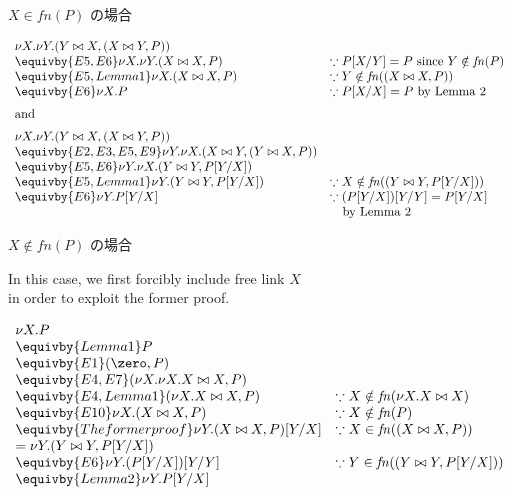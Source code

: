 \begin{frame}{
    \(X \in \mathit{fn}(P)\) の場合
  }
  
  
  \(\begin{array}{ll}
  \nu X. \nu Y. (Y \bowtie X, (X \bowtie Y, P)) &
  \\
  \equivby{E5, E6}
  \nu X. \nu Y. (X \bowtie X, P)
  & \because P[X/Y] = P \mbox{ since } Y \notin \mathit{fn}(P)
  \\
  \equivby{E5, Lemma 1}
  \nu X.(X \bowtie X, P)
  & \because Y \notin \mathit{fn}((X \bowtie X, P))
  \\
  \equivby{E6}
  \nu X.P
  & \because P[X/X] = P \mbox{ by Lemma 2}
  \\[\medskipamount]
  \mbox{and}
  \\[\medskipamount]
  \nu X. \nu Y. (Y \bowtie X, (X \bowtie Y, P)) &
  \\
  \equivby{E2, E3, E5, E9}
  \nu Y. \nu X. (X \bowtie Y, (Y \bowtie X, P)) &
  \\
  \equivby{E5, E6}
  \nu Y. \nu X. (Y \bowtie Y, P[Y/X]) & 
  \\
  \equivby{E5, Lemma 1}
  \nu Y. (Y \bowtie Y, P[Y/X])
  & \because X \notin \mathit{fn}((Y \bowtie Y, P[Y/X]))
  \\
  \equivby{E6}
  \nu Y.P[Y/X]
  & \because (P[Y/X])[Y/Y] = P[Y/X] \\
  & \ \ \mbox{ by Lemma 2}
  \end{array}\)
\end{frame}



\begin{frame}{
    \(X \notin \mathit{fn}(P)\) の場合
  }

  In this case, we first forcibly include free link \(X\)\\
  in order to exploit the former proof. 

  \(\begin{array}{ll}
  \nu X. P
  \\
  \equivby{Lemma 1}
  P
  \\
  \equivby{E1}
  (\zero, P)
  \\
  \equivby{E4, E7}
  (\nu X. \nu X. X \bowtie X, P)
  \\
  \equivby{E4, Lemma 1}
  (\nu X. X \bowtie X, P)
  & \because X \notin \mathit{fn}(\nu X. X \bowtie X)
  \\
  \equivby{E10}
  \nu X. (X \bowtie X, P)
  & \because X \notin \mathit{fn}(P)
  \\
  \equivby{The former proof}
  \nu Y. (X \bowtie X, P)[Y/X]
  & \because X \in \mathit{fn}((X \bowtie X, P))
  \\
  =
  \nu Y. (Y \bowtie Y, P[Y/X])
  \\
  \equivby{E6}
  \nu Y. (P[Y/X])[Y/Y]
  & \because Y \in \mathit{fn}((Y \bowtie Y, P[Y/X]))
  \\
  \equivby{Lemma 2}
  \nu Y. P[Y/X]
  \end{array}\)
  
\end{frame}


